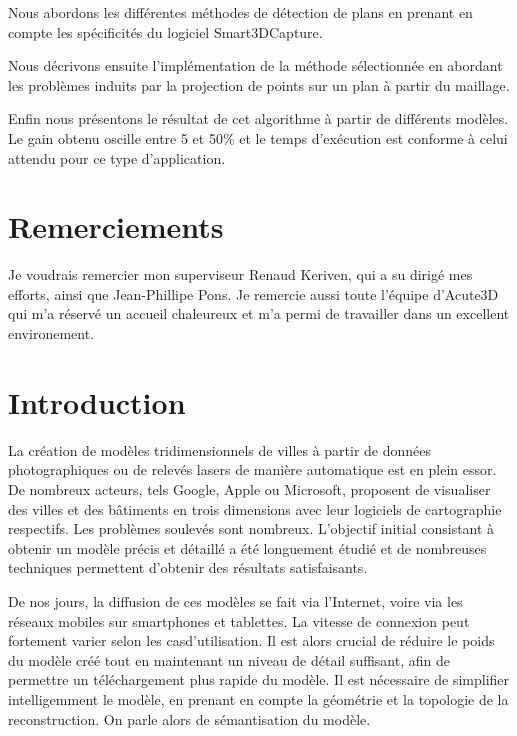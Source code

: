 ﻿\documentclass[12pt, twoside]{article}
\let\oldsection\section
\def\section{\cleardoublepage\oldsection}
\begin{document}
Nous abordons les différentes méthodes de détection de plans en prenant en compte les spécificités du logiciel Smart3DCapture.

Nous décrivons ensuite l'implémentation de la méthode sélectionnée en abordant les problèmes induits par la projection de points sur un plan à partir du maillage.

Enfin nous présentons le résultat de cet algorithme à partir de différents modèles. Le gain obtenu oscille entre 5 et 50\% et le temps d'exécution est conforme à celui attendu pour ce type d'application.

\section*{Remerciements}
Je voudrais remercier mon superviseur Renaud Keriven, qui a su dirigé mes efforts, ainsi que Jean-Phillipe Pons. Je remercie aussi toute l'équipe d'Acute3D qui m'a réservé un accueil chaleureux et m'a permi de travailler dans un excellent environement.
\newpage

\tableofcontents
\newpage

\section*{Introduction}
La création de modèles tridimensionnels de villes à partir de données photographiques ou de relevés lasers de manière automatique est en plein essor. De nombreux acteurs, tels Google, Apple ou Microsoft, proposent de visualiser des villes et des bâtiments en trois dimensions avec leur logiciels de cartographie respectifs. Les problèmes soulevés sont nombreux. L'objectif initial consistant à obtenir un modèle précis et détaillé a été longuement étudié et de nombreuses techniques permettent d'obtenir des résultats satisfaisants.

De nos jours, la diffusion de ces modèles se fait via l'Internet, voire via les réseaux mobiles sur smartphones et tablettes. La vitesse de connexion peut fortement varier selon les casd'utilisation. Il est alors crucial de réduire le poids du modèle créé tout en maintenant un niveau de détail suffisant, afin de permettre un téléchargement plus rapide du modèle. Il est nécessaire de simplifier intelligemment le modèle, en prenant en compte la géométrie et la topologie de la reconstruction. On parle alors de sémantisation du modèle.
\end{document}
